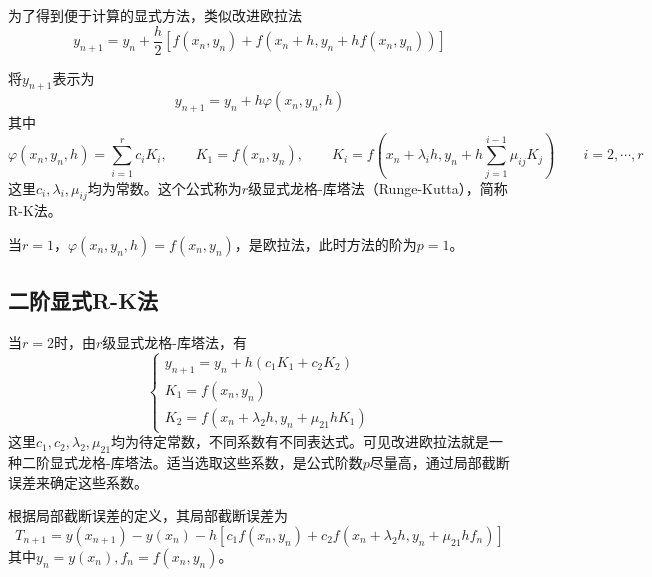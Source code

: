 为了得到便于计算的显式方法，类似改进欧拉法
$$y_{n+1}=y_n+\frac{h}{2}[f(x_n,y_n)+f(x_n+h,y_n+hf(x_n,y_n))]$$

将$y_{n+1}$表示为
$$y_{n+1}=y_n+h\varphi(x_n,y_n,h)$$
其中
$$\varphi(x_n,y_n,h)=\sum_{i=1}^rc_iK_i,
\qquad K_1=f(x_n,y_n),
\qquad K_i=f(x_n+\lambda_i h, y_n+h\sum_{j=1}^{i-1}\mu_{ij}K_j)
\qquad i=2,\cdots,r$$
这里$c_i,\lambda_i,\mu_{ij}$均为常数。这个公式称为$r$级显式龙格-库塔法（Runge-Kutta），简称R-K法。

当$r=1$，$\varphi(x_n,y_n,h)=f(x_n,y_n)$，是欧拉法，此时方法的阶为$p=1$。



\subsection{二阶显式R-K法}
当$r=2$时，由$r$级显式龙格-库塔法，有
$$\begin{cases}y_{n+1}=y_n+h(c_1K_1+c_2K_2) \\
K_1=f(x_n,y_n)\\
K_2=f(x_n+\lambda_2h,y_n+\mu_{21}hK_1)
\end{cases}$$
这里$c_1,c_2,\lambda_2,\mu_{21}$均为待定常数，不同系数有不同表达式。可见改进欧拉法就是一种二阶显式龙格-库塔法。适当选取这些系数，是公式阶数$p$尽量高，通过局部截断误差来确定这些系数。

根据局部截断误差的定义，其局部截断误差为
$$T_{n+1}=y(x_{n+1})-y(x_n)-h[c_1f(x_n,y_n)+c_2f(x_n+\lambda_2h,y_n+\mu_{21}hf_n)]$$
其中$y_n=y(x_n),f_n=f(x_n,y_n)$。

